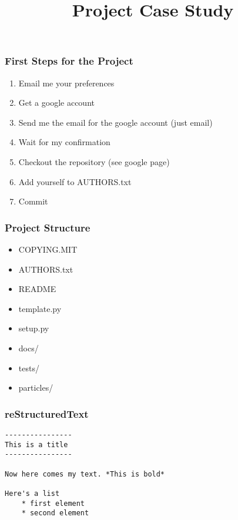 
\title{Project Case Study}

\frame{\maketitle}


\begin{frame}[fragile]
\frametitle{First Steps for the Project}
\begin{enumerate}
\item Email me your preferences
\item Get a google account
\item Send me the email for the google account (just email)
\item Wait for my confirmation
\item Checkout the repository (see google page)
\item Add yourself to AUTHORS.txt
\item Commit
\end{enumerate}
\end{frame}

\begin{frame}[fragile]
\frametitle{Project Structure}
\begin{itemize}
\item COPYING.MIT
\item AUTHORS.txt
\item README
\item template.py
\item setup.py
\item docs/
\item tests/
\item particles/
\end{itemize}
\end{frame}

\begin{frame}[fragile]
\frametitle{reStructuredText}

\begin{verbatim}
----------------
This is a title
----------------

Now here comes my text. *This is bold*

Here's a list
    * first element
    * second element
\end{verbatim}

\end{frame}

